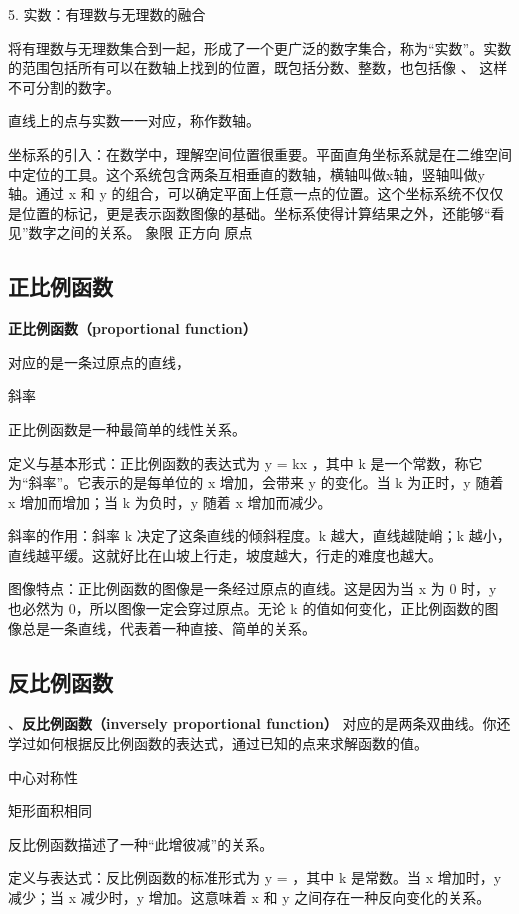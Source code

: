 5. 实数：有理数与无理数的融合

将有理数与无理数集合到一起，形成了一个更广泛的数字集合，称为“实数”。实数的范围包括所有可以在数轴上找到的位置，既包括分数、整数，也包括像  、 \pi 这样不可分割的数字。



直线上的点与实数一一对应，称作数轴。

坐标系的引入：在数学中，理解空间位置很重要。平面直角坐标系就是在二维空间中定位的工具。这个系统包含两条互相垂直的数轴，横轴叫做x轴，竖轴叫做y轴。通过 x 和 y 的组合，可以确定平面上任意一点的位置。这个坐标系统不仅仅是位置的标记，更是表示函数图像的基础。坐标系使得计算结果之外，还能够“看见”数字之间的关系。
象限
正方向
原点

\subsection{正比例函数}

\textbf{正比例函数（proportional function）}

对应的是一条过原点的直线，

斜率

正比例函数是一种最简单的线性关系。

定义与基本形式：正比例函数的表达式为  y = kx ，其中 k 是一个常数，称它为“斜率”。它表示的是每单位的 x 增加，会带来 y 的变化。当 k 为正时，y 随着 x 增加而增加；当 k 为负时，y 随着 x 增加而减少。

斜率的作用：斜率 k 决定了这条直线的倾斜程度。k 越大，直线越陡峭；k 越小，直线越平缓。这就好比在山坡上行走，坡度越大，行走的难度也越大。

图像特点：正比例函数的图像是一条经过原点的直线。这是因为当 x 为 0 时，y 也必然为 0，所以图像一定会穿过原点。无论 k 的值如何变化，正比例函数的图像总是一条直线，代表着一种直接、简单的关系。

\subsection{反比例函数}

、\textbf{反比例函数（inversely proportional function）}
对应的是两条双曲线。你还学过如何根据反比例函数的表达式，通过已知的点来求解函数的值。

中心对称性

矩形面积相同

反比例函数描述了一种“此增彼减”的关系。

定义与表达式：反比例函数的标准形式为  y =  ，其中 k 是常数。当 x 增加时，y 减少；当 x 减少时，y 增加。这意味着 x 和 y 之间存在一种反向变化的关系。

